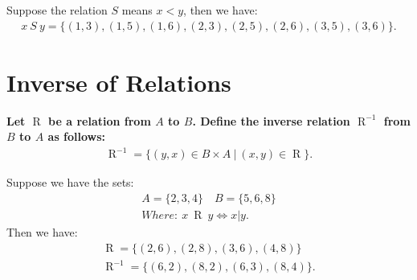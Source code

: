 \documentclass{report}
\begin{document}
    \bigbreak \noindent 
    Suppose the relation $S$ means $x < y$, then we have:
    \begin{align*}
        x\ S\ y = \{(1,3),(1,5),(1,6),(2,3),(2,5),(2,6),(3,5),(3,6)\} 
    .\end{align*}

    \bigbreak \noindent 

    \pagebreak \bigbreak \noindent 
    \section{\LARGE Inverse of Relations}
    \bigbreak \noindent 
    \smallbreak \noindent
    \begin{definition}
        \textbf{Let $\mathrel{R}$ be a relation from $A$ to $B$. Define the inverse relation $\mathrel{R}^{-1}$ from $B$ to $A$ as follows:
            \begin{align*}
                \mathrel{R}^{-1} = \{(y,x) \in B \times A\ |\ (x,y) \in \mathrel{R}\}
            .\end{align*}
        } 
    \end{definition}
    \bigbreak \noindent 
    Suppose we have the sets:
    \begin{align*}
        A = \{2,3,4\} \quad B = \{5,6,8\} \\
        Where:\ x\ \mathrel{R}\ y \iff x|y
    .\end{align*}
    \bigbreak \noindent 
    Then we have:
    \begin{align*}
        \mathrel{R} = \{(2,6),(2,8),(3,6),(4,8)\} \\
        \mathrel{R}^{-1} = \{(6,2),(8,2),(6,3),(8,4)\}
    .\end{align*}

    \pagebreak \bigbreak \noindent 
\end{document}
